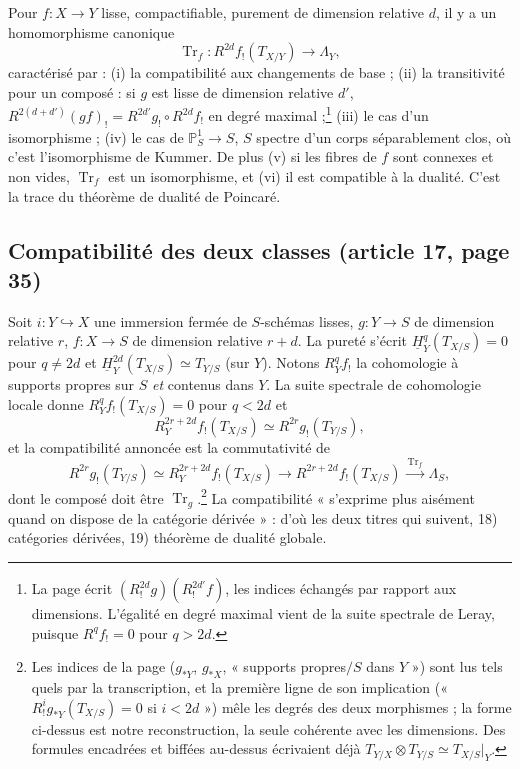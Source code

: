 \documentclass[11pt,a4paper]{article}
\begin{document}
Pour $f : X \to Y$ lisse, compactifiable, purement de dimension relative $d$,
il y a un homomorphisme canonique
\[
  \operatorname{Tr}_{f} : R^{2d}f_{!}(T_{X/Y}) \longrightarrow \Lambda_{Y},
\]
caractérisé par : (i) la compatibilité aux changements de base ; (ii) la
transitivité pour un composé : si $g$ est lisse de dimension relative $d'$,
$R^{2(d+d')}(gf)_{!} = R^{2d'}g_{!} \circ R^{2d}f_{!}$ en degré
maximal ;\footnote{La page écrit $(R^{2d}_{!}g)(R^{2d'}_{!}f)$, les indices
échangés par rapport aux dimensions. L'égalité en degré maximal vient de la
suite spectrale de Leray, puisque $R^{q}f_{!} = 0$ pour $q > 2d$.} (iii) le
cas d'un isomorphisme ; (iv) le cas de $\mathbb{P}^{1}_{S} \to S$, $S$ spectre
d'un corps séparablement clos, où c'est l'isomorphisme de Kummer. De plus (v)
si les fibres de $f$ sont connexes et non vides, $\operatorname{Tr}_{f}$ est
un isomorphisme, et (vi) il est compatible à la dualité. C'est la trace du
théorème de dualité de Poincaré.

\subsection*{Compatibilité des deux classes (article 17, page 35)}

Soit $i : Y \hookrightarrow X$ une immersion fermée de $S$-schémas lisses, $g :
Y \to S$ de dimension relative $r$, $f : X \to S$ de dimension relative $r +
d$. La pureté s'écrit $\underline{H}^{q}_{Y}(T_{X/S}) = 0$ pour $q \neq 2d$ et
$\underline{H}^{2d}_{Y}(T_{X/S}) \simeq T_{Y/S}$ (sur $Y$). Notons
$R^{q}_{Y}f_{!}$ la cohomologie à supports propres sur $S$ \emph{et} contenus
dans $Y$. La suite spectrale de cohomologie locale donne $R^{q}_{Y}f_{!}(T_{X/S})
= 0$ pour $q < 2d$ et
\[
  R^{2r+2d}_{Y}f_{!}(T_{X/S}) \simeq R^{2r}g_{!}(T_{Y/S}),
\]
et la compatibilité annoncée est la commutativité de
\[
  R^{2r}g_{!}(T_{Y/S}) \simeq R^{2r+2d}_{Y}f_{!}(T_{X/S}) \longrightarrow
  R^{2r+2d}f_{!}(T_{X/S}) \xrightarrow{\ \operatorname{Tr}_{f}\ } \Lambda_{S},
\]
dont le composé doit être $\operatorname{Tr}_{g}$.\footnote{Les indices de la
page ($g_{*Y}$, $g_{*X}$, « supports propres$/S$ dans $Y$ ») sont lus tels
quels par la transcription, et la première ligne de son implication
(« $R^{i}_{!}g_{*Y}(T_{X/S}) = 0$ si $i < 2d$ ») mêle les degrés des deux
morphismes ; la forme ci-dessus est notre reconstruction, la seule cohérente
avec les dimensions. Des formules encadrées et biffées au-dessus écrivaient
déjà $T_{Y/X} \otimes T_{Y/S} \simeq T_{X/S}|_{Y}$.} La compatibilité
« s'exprime plus aisément quand on dispose de la catégorie dérivée » : d'où les
deux titres qui suivent, 18) catégories dérivées, 19) théorème de dualité
globale.
\end{document}
